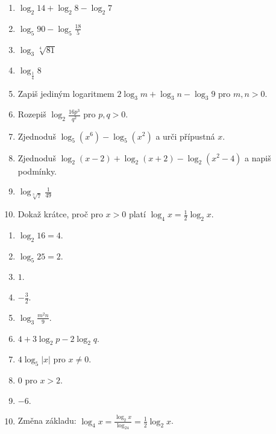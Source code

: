 \documentclass[11pt,a4paper]{article}
\begin{document}
\begin{zadaniReseniBox}[title={Domácí úkol}]
\begin{enumerate}[label=\alph*)]
\item $\log_2 14+\log_2 8-\log_2 7$
\item $\log_5 90-\log_5\frac{18}{5}$
\item $\log_3\sqrt[4]{81}$
\item $\log_{\frac14}8$
\item Zapiš jediným logaritmem $2\log_3m+\log_3 n-\log_3 9$ pro $m,n>0$.
\item Rozepiš $\log_2\frac{16p^3}{q^2}$ pro $p,q>0$.
\item Zjednoduš $\log_5(x^6)-\log_5(x^2)$ a urči přípustná $x$.
\item Zjednoduš $\log_2(x-2)+\log_2(x+2)-\log_2(x^2-4)$ a napiš podmínky.
\item $\log_{\sqrt[3]{7}}\frac1{49}$
\item Dokaž krátce, proč pro $x>0$ platí $\log_4x=\frac12\log_2x$.
\end{enumerate}
\tcblower
\begin{enumerate}[label=\alph*)]
\item $\log_2 16=4$.
\item $\log_5 25=2$.
\item $1$.
\item $-\frac32$.
\item $\log_3\frac{m^2n}{9}$.
\item $4+3\log_2p-2\log_2q$.
\item $4\log_5|x|$ pro $x\ne0$.
\item $0$ pro $x>2$.
\item $-6$.
\item Změna základu: $\log_4x=\frac{\log_2x}{\log_24}=\frac12\log_2x$.
\end{enumerate}
\end{zadaniReseniBox}
\end{document}
